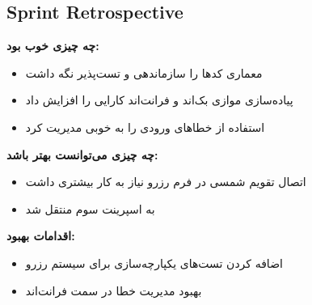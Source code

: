 \documentclass[12pt, a4paper]{article}
\begin{document}
\subsection{Sprint Retrospective}

\textbf{چه چیزی خوب بود:}
\begin{itemize}[rightmargin=0.5cm]
  \item معماری  کدها را سازماندهی و تست‌پذیر نگه داشت
  \item پیاده‌سازی موازی بک‌اند و فرانت‌اند کارایی را افزایش داد
  \item استفاده از  خطاهای ورودی را به خوبی مدیریت کرد
\end{itemize}

\textbf{چه چیزی می‌توانست بهتر باشد:}
\begin{itemize}[rightmargin=0.5cm]
  \item اتصال تقویم شمسی در فرم رزرو نیاز به کار بیشتری داشت
  \item {} به اسپرینت سوم منتقل شد
\end{itemize}

\textbf{اقدامات بهبود:}
\begin{itemize}[rightmargin=0.5cm]
  \item اضافه کردن تست‌های یکپارچه‌سازی برای سیستم رزرو
  \item بهبود مدیریت خطا در سمت فرانت‌اند
\end{itemize}
\end{document}
